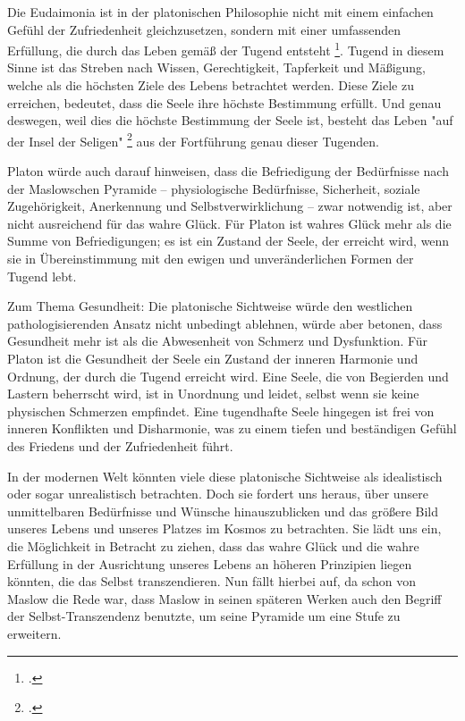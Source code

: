 \documentclass[12pt,a4paper]{article}
\begin{document}
Die Eudaimonia ist in der platonischen Philosophie nicht mit einem einfachen Gefühl der Zufriedenheit gleichzusetzen, sondern mit einer umfassenden Erfüllung, die durch das Leben gemäß der Tugend entsteht \footcite[524d]{gorgias}. Tugend in diesem Sinne ist das Streben nach Wissen, Gerechtigkeit, Tapferkeit und Mäßigung, welche als die höchsten Ziele des Lebens betrachtet werden. Diese Ziele zu erreichen, bedeutet, dass die Seele ihre höchste Bestimmung erfüllt. Und genau deswegen, weil dies die höchste Bestimmung der Seele ist, besteht das Leben "auf der Insel der Seligen" \footcite[41b-c]{apologie} aus der Fortführung genau dieser Tugenden.

Platon würde auch darauf hinweisen, dass die Befriedigung der Bedürfnisse nach der Maslowschen Pyramide – physiologische Bedürfnisse, Sicherheit, soziale Zugehörigkeit, Anerkennung und Selbstverwirklichung – zwar notwendig ist, aber nicht ausreichend für das wahre Glück. Für Platon ist wahres Glück mehr als die Summe von Befriedigungen; es ist ein Zustand der Seele, der erreicht wird, wenn sie in Übereinstimmung mit den ewigen und unveränderlichen Formen der Tugend lebt.

Zum Thema Gesundheit: Die platonische Sichtweise würde den westlichen pathologisierenden Ansatz nicht unbedingt ablehnen, würde aber betonen, dass Gesundheit mehr ist als die Abwesenheit von Schmerz und Dysfunktion. Für Platon ist die Gesundheit der Seele ein Zustand der inneren Harmonie und Ordnung, der durch die Tugend erreicht wird. Eine Seele, die von Begierden und Lastern beherrscht wird, ist in Unordnung und leidet, selbst wenn sie keine physischen Schmerzen empfindet. Eine tugendhafte Seele hingegen ist frei von inneren Konflikten und Disharmonie, was zu einem tiefen und beständigen Gefühl des Friedens und der Zufriedenheit führt.

In der modernen Welt könnten viele diese platonische Sichtweise als idealistisch oder sogar unrealistisch betrachten. Doch sie fordert uns heraus, über unsere unmittelbaren Bedürfnisse und Wünsche hinauszublicken und das größere Bild unseres Lebens und unseres Platzes im Kosmos zu betrachten. Sie lädt uns ein, die Möglichkeit in Betracht zu ziehen, dass das wahre Glück und die wahre Erfüllung in der Ausrichtung unseres Lebens an höheren Prinzipien liegen könnten, die das Selbst transzendieren. Nun fällt hierbei auf, da schon von Maslow die Rede war, dass Maslow in seinen späteren Werken auch den Begriff der Selbst-Transzendenz benutzte, um seine Pyramide um eine Stufe zu erweitern.
\end{document}
